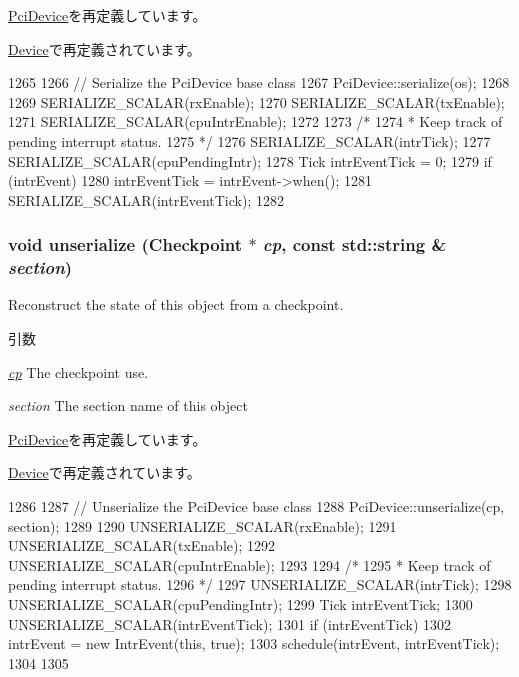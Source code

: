 \hyperlink{classPciDevice_a53e036786d17361be4c7320d39c99b84}{PciDevice}を再定義しています。

\hyperlink{classSinic_1_1Device_a53e036786d17361be4c7320d39c99b84}{Device}で再定義されています。


\begin{DoxyCode}
1265 {
1266     // Serialize the PciDevice base class
1267     PciDevice::serialize(os);
1268 
1269     SERIALIZE_SCALAR(rxEnable);
1270     SERIALIZE_SCALAR(txEnable);
1271     SERIALIZE_SCALAR(cpuIntrEnable);
1272 
1273     /*
1274      * Keep track of pending interrupt status.
1275      */
1276     SERIALIZE_SCALAR(intrTick);
1277     SERIALIZE_SCALAR(cpuPendingIntr);
1278     Tick intrEventTick = 0;
1279     if (intrEvent)
1280         intrEventTick = intrEvent->when();
1281     SERIALIZE_SCALAR(intrEventTick);
1282 }
\end{DoxyCode}
\hypertarget{classSinic_1_1Base_af22e5d6d660b97db37003ac61ac4ee49}{
\subsubsection[{unserialize}]{\setlength{\rightskip}{0pt plus 5cm}void unserialize ({\bf Checkpoint} $\ast$ {\em cp}, \/  const std::string \& {\em section})}}
\label{classSinic_1_1Base_af22e5d6d660b97db37003ac61ac4ee49}
Reconstruct the state of this object from a checkpoint. 
\begin{DoxyParams}{引数}
\item[{\em \hyperlink{namespacecp}{cp}}]The checkpoint use. \item[{\em section}]The section name of this object \end{DoxyParams}


\hyperlink{classPciDevice_af22e5d6d660b97db37003ac61ac4ee49}{PciDevice}を再定義しています。

\hyperlink{classSinic_1_1Device_af22e5d6d660b97db37003ac61ac4ee49}{Device}で再定義されています。


\begin{DoxyCode}
1286 {
1287     // Unserialize the PciDevice base class
1288     PciDevice::unserialize(cp, section);
1289 
1290     UNSERIALIZE_SCALAR(rxEnable);
1291     UNSERIALIZE_SCALAR(txEnable);
1292     UNSERIALIZE_SCALAR(cpuIntrEnable);
1293 
1294     /*
1295      * Keep track of pending interrupt status.
1296      */
1297     UNSERIALIZE_SCALAR(intrTick);
1298     UNSERIALIZE_SCALAR(cpuPendingIntr);
1299     Tick intrEventTick;
1300     UNSERIALIZE_SCALAR(intrEventTick);
1301     if (intrEventTick) {
1302         intrEvent = new IntrEvent(this, true);
1303         schedule(intrEvent, intrEventTick);
1304     }
1305 }
\end{DoxyCode}


